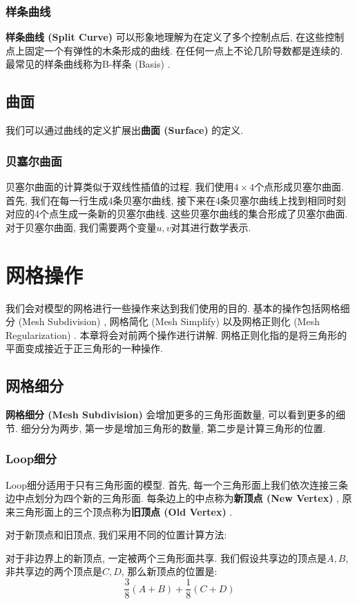 \subsection{样条曲线}
\textbf{样条曲线 (Split Curve) }可以形象地理解为在定义了多个控制点后, 在这些控制点上固定一个有弹性的木条形成的曲线. 在任何一点上不论几阶导数都是连续的. 最常见的样条曲线称为B-样条 (Basis) . 

\section{曲面}
我们可以通过曲线的定义扩展出\textbf{曲面 (Surface) }的定义. 

\subsection{贝塞尔曲面}
贝塞尔曲面的计算类似于双线性插值的过程. 我们使用$4\times 4$个点形成贝塞尔曲面. 首先, 我们在每一行生成4条贝塞尔曲线, 接下来在4条贝塞尔曲线上找到相同时刻对应的4个点生成一条新的贝塞尔曲线. 这些贝塞尔曲线的集合形成了贝塞尔曲面. 对于贝塞尔曲面, 我们需要两个变量$u,v$对其进行数学表示. 

\chapter{网格操作}
我们会对模型的网格进行一些操作来达到我们使用的目的. 基本的操作包括网格细分 (Mesh Subdivision) , 网格简化 (Mesh Simplify) 以及网格正则化 (Mesh Regularization) . 本章将会对前两个操作进行讲解. 网格正则化指的是将三角形的平面变成接近于正三角形的一种操作. 

\section{网格细分}
\textbf{网格细分 (Mesh Subdivision) }会增加更多的三角形面数量, 可以看到更多的细节. 细分分为两步, 第一步是增加三角形的数量, 第二步是计算三角形的位置. 

\subsection{Loop细分}
Loop细分适用于只有三角形面的模型. 首先, 每一个三角形面上我们依次连接三条边中点划分为四个新的三角形面. 每条边上的中点称为\textbf{新顶点 (New Vertex) }, 原来三角形面上的三个顶点称为\textbf{旧顶点 (Old Vertex) }. 

对于新顶点和旧顶点, 我们采用不同的位置计算方法: 

对于非边界上的新顶点, 一定被两个三角形面共享. 我们假设共享边的顶点是$A,B$, 非共享边的两个顶点是$C,D$, 那么新顶点的位置是: 
\begin{equation}
	\frac{3}{8}(A+B)+\frac{1}{8}(C+D)
\end{equation}

